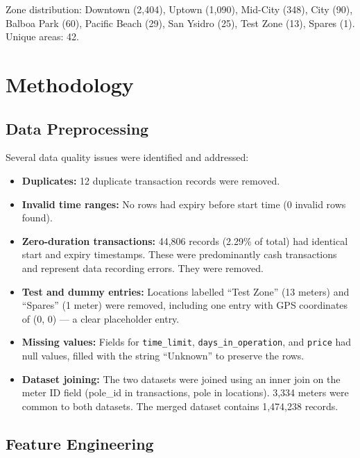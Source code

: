 \documentclass[12pt, a4paper]{article}
\begin{document}
Zone distribution: Downtown (2,404), Uptown (1,090), Mid-City (348),
City (90), Balboa Park (60), Pacific Beach (29), San Ysidro (25),
Test Zone (13), Spares (1). Unique areas: 42.

\section{Methodology}

\subsection{Data Preprocessing}

Several data quality issues were identified and addressed:

\begin{itemize}
    \item \textbf{Duplicates:} 12 duplicate transaction records were
    removed.

    \item \textbf{Invalid time ranges:} No rows had expiry before start
    time (0 invalid rows found).

    \item \textbf{Zero-duration transactions:} 44,806 records (2.29\%
    of total) had identical start and expiry timestamps. These were
    predominantly cash transactions and represent data recording errors.
    They were removed.

    \item \textbf{Test and dummy entries:} Locations labelled
    ``Test Zone'' (13 meters) and ``Spares'' (1 meter) were removed,
    including one entry with GPS coordinates of (0, 0) --- a clear
    placeholder entry.

    \item \textbf{Missing values:} Fields for \texttt{time\_limit},
    \texttt{days\_in\_operation}, and \texttt{price} had null values,
    filled with the string ``Unknown'' to preserve the rows.

    \item \textbf{Dataset joining:} The two datasets were joined using
    an inner join on the meter ID field (pole\_id in transactions,
    pole in locations). 3,334 meters were common to both datasets.
    The merged dataset contains 1,474,238 records.
\end{itemize}

\subsection{Feature Engineering}
\end{document}
